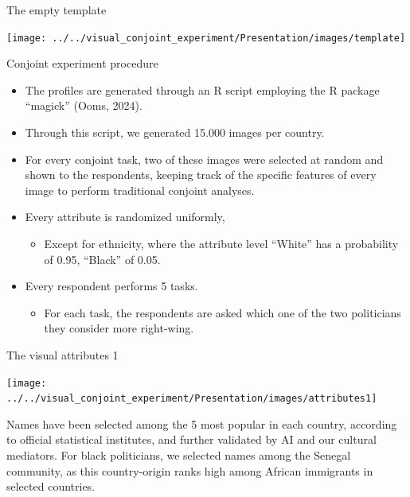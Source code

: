 \documentclass[
  ignorenonframetext,
]{beamer}
\providecommand{\tightlist}{%
  \setlength{\itemsep}{0pt}\setlength{\parskip}{0pt}}
\begin{document}
\begin{frame}{The empty template}
\label{the-empty-template}
\begin{center}\texttt{[image: ../../visual\_conjoint\_experiment/Presentation/images/template]} \end{center}
\end{frame}

\begin{frame}{Conjoint experiment procedure}
\label{conjoint-experiment-procedure}
\begin{itemize}
\tightlist
\item
  The profiles are generated through an R script employing the R package
  ``magick'' (Ooms, 2024).
\item
  Through this script, we generated 15.000 images per country.
\item
  For every conjoint task, two of these images were selected at random
  and shown to the respondents, keeping track of the specific features
  of every image to perform traditional conjoint analyses.
\item
  Every attribute is randomized uniformly,

  \begin{itemize}
  \tightlist
  \item
    Except for ethnicity, where the attribute level ``White'' has a
    probability of 0.95, ``Black'' of 0.05.
  \end{itemize}
\item
  Every respondent performs 5 tasks.

  \begin{itemize}
  \tightlist
  \item
    For each task, the respondents are asked which one of the two
    politicians they consider more right-wing.
  \end{itemize}
\end{itemize}
\end{frame}

\begin{frame}{The visual attributes 1}
\label{the-visual-attributes-1}
\begin{center}\texttt{[image: ../../visual\_conjoint\_experiment/Presentation/images/attributes1]} \end{center}

Names have been selected among the 5 most popular in each country,
according to official statistical institutes, and further validated by
AI and our cultural mediators. For black politicians, we selected names
among the Senegal community, as this country-origin ranks high among
African immigrants in selected countries.
\end{frame}
\end{document}
